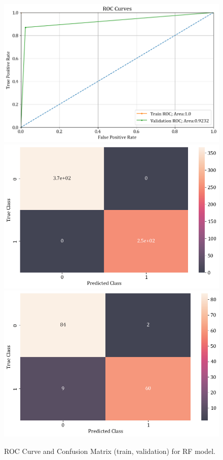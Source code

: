 \documentclass[11pt,a4paper]{article}
\begin{document}
\begin{figure}[H]
	\centering
	\includegraphics[scale=0.26]{images/H4_roc_corve.png}
	\includegraphics[scale=0.26]{images/H4_confusion_matrix.png}
	\includegraphics[scale=0.26]{images/H4_confusion_matrix_val_test.png}
	\caption{ROC Curve and Confusion Matrix (train, validation) for RF model.}
	\label{fig:H4_roc_conf}
\end{figure}
\end{document}
